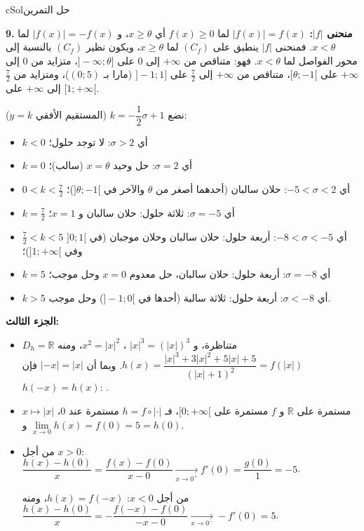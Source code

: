 \documentclass[12pt,a4paper]{article}
\newcounter{exo}
\newenvironment{hal}{\Needspace{12\baselineskip}\begin{otherlanguage}{english}\begin{arbox}[breakable]{cSol}{حل التمرين \theexo}}{\end{arbox}\end{otherlanguage}}
\newcommand{\ar}[1]{\foreignlanguage{arabic}{#1}}
\newcommand{\R}{\mathbb{R}}
\newcommand{\QQ}[1]{\par\smallskip\textbf{#1.} }
\newcommand{\bxt}[1]{\foreignlanguage{english}{\bxtbox{\ar{#1}}}}
\begin{document}
\begin{hal}
\QQ{9} \textbf{منحنى $|f|$:} $|f(x)|=f(x)$ لما $f(x)\geqslant0$ أي $x\geqslant\theta$، و $|f(x)|=-f(x)$ لما $x<\theta$. فمنحنى $|f|$ ينطبق على $(C_f)$ لما $x\geqslant\theta$، ويكون نظير $(C_f)$ بالنسبة إلى محور الفواصل لما $x<\theta$.
فهو: متناقص من $+\infty$ إلى $0$ على $]-\infty;\theta]$، متزايد من $0$ إلى $+\infty$ على $[\theta;-1[$، متناقص من $+\infty$ إلى $\tfrac72$ على $]-1;1]$ (مارا بـ $(0;5)$)، ومتزايد من $\tfrac72$ إلى $+\infty$ على $[1;+\infty[$.

نضع $k=-\dfrac12\sigma+1$ (المستقيم الأفقي $y=k$):
\begin{itemize}
\item $k<0$ أي $\sigma>2$: لا توجد حلول؛
\item $k=0$ أي $\sigma=2$: حل وحيد $x=\theta$ (سالب)؛
\item $0<k<\tfrac72$ أي $-5<\sigma<2$: حلان سالبان (أحدهما أصغر من $\theta$ والآخر في $]\theta;-1[$)؛
\item $k=\tfrac72$ أي $\sigma=-5$: ثلاثة حلول: حلان سالبان و $x=1$؛
\item $\tfrac72<k<5$ أي $-8<\sigma<-5$: أربعة حلول: حلان سالبان وحلان موجبان (في $]0;1[$ وفي $]1;+\infty[$)؛
\item $k=5$ أي $\sigma=-8$: أربعة حلول: حلان سالبان، حل معدوم $x=0$ وحل موجب؛
\item $k>5$ أي $\sigma<-8$: أربعة حلول: ثلاثة سالبة (أحدها في $]-1;0[$) وحل موجب.
\end{itemize}

\textbf{الجزء الثالث:}
\begin{itemize}[label=$\star$]
\item $D_h=\R$ متناظرة، و $|x|^{3}=\left(|x|\right)^{3}$ ، $x^{2}=|x|^{2}$، ومنه $h(x)=\dfrac{|x|^{3}+3|x|^{2}+5|x|+5}{(|x|+1)^{2}}=f(|x|)$. وبما أن $|-x|=|x|$ فإن $h(-x)=h(x)$: \bxt{$h$ دالة زوجية}.
\item $x\mapsto|x|$ مستمرة على $\R$ و $f$ مستمرة على $[0;+\infty[$، فـ $h=f\circ|\cdot|$ مستمرة عند $0$، و $\lim\limits_{x\to0}h(x)=f(0)=5=h(0)$.
\item من أجل $x>0$: $\dfrac{h(x)-h(0)}{x}=\dfrac{f(x)-f(0)}{x-0}\xrightarrow[x\to0^{+}]{}f'(0)=\dfrac{g(0)}{1}=-5$.

من أجل $x<0$: $h(x)=f(-x)$، ومنه $\dfrac{h(x)-h(0)}{x}=-\dfrac{f(-x)-f(0)}{-x-0}\xrightarrow[x\to0^{-}]{}-f'(0)=5$.


\end{itemize}
\end{hal}
\end{document}
